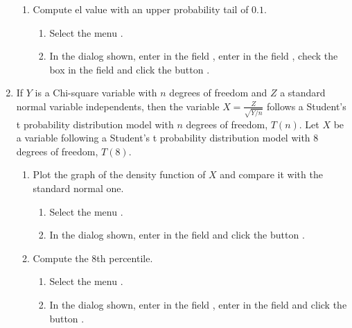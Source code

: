 \begin{enumerate}[leftmargin=*]
\begin{enumerate}
\item Compute el value with an upper probability tail of $0.1$.
\begin{indication}
\begin{enumerate}
\item Select the menu .
\item In the dialog shown, enter  in the field , enter  in the field , check the box  in the field  and click the button .  
\end{enumerate}
\end{indication}
\end{enumerate}


\item If $Y$ is a Chi-square variable with $n$ degrees of freedom and $Z$ a standard normal variable independents, then the variable $X=\frac{Z}{\sqrt{Y/n}}$ follows a Student's t probability distribution model with $n$ degrees of freedom, $T(n)$. 
Let $X$ be a variable following a Student's t probability distribution model with 8 degrees of freedom, $T(8)$.

\begin{enumerate}
\item Plot the graph of the density function of $X$ and compare it with the standard normal one.
\begin{indication}
\begin{enumerate}
\item Select the menu .
\item In the dialog shown, enter  in the field  and click the button .
\end{enumerate}
\end{indication}

\item Compute the 8th percentile.
\begin{indication}
\begin{enumerate}
\item Select the menu .
\item In the dialog shown, enter  in the field , enter  in the field  and click the button .
\end{enumerate}
\end{indication}


\end{enumerate}
\end{enumerate}
